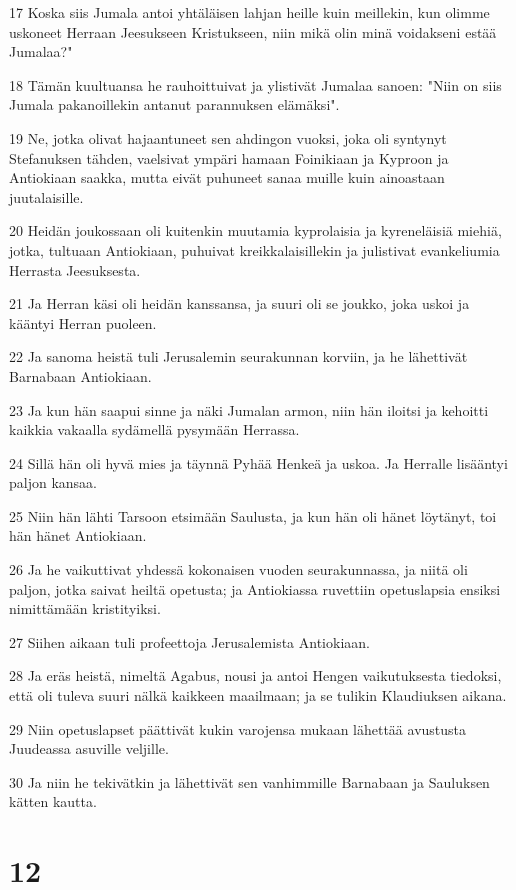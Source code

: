 \par 17 Koska siis Jumala antoi yhtäläisen lahjan heille kuin meillekin, kun olimme uskoneet Herraan Jeesukseen Kristukseen, niin mikä olin minä voidakseni estää Jumalaa?"
\par 18 Tämän kuultuansa he rauhoittuivat ja ylistivät Jumalaa sanoen: "Niin on siis Jumala pakanoillekin antanut parannuksen elämäksi".
\par 19 Ne, jotka olivat hajaantuneet sen ahdingon vuoksi, joka oli syntynyt Stefanuksen tähden, vaelsivat ympäri hamaan Foinikiaan ja Kyproon ja Antiokiaan saakka, mutta eivät puhuneet sanaa muille kuin ainoastaan juutalaisille.
\par 20 Heidän joukossaan oli kuitenkin muutamia kyprolaisia ja kyreneläisiä miehiä, jotka, tultuaan Antiokiaan, puhuivat kreikkalaisillekin ja julistivat evankeliumia Herrasta Jeesuksesta.
\par 21 Ja Herran käsi oli heidän kanssansa, ja suuri oli se joukko, joka uskoi ja kääntyi Herran puoleen.
\par 22 Ja sanoma heistä tuli Jerusalemin seurakunnan korviin, ja he lähettivät Barnabaan Antiokiaan.
\par 23 Ja kun hän saapui sinne ja näki Jumalan armon, niin hän iloitsi ja kehoitti kaikkia vakaalla sydämellä pysymään Herrassa.
\par 24 Sillä hän oli hyvä mies ja täynnä Pyhää Henkeä ja uskoa. Ja Herralle lisääntyi paljon kansaa.
\par 25 Niin hän lähti Tarsoon etsimään Saulusta, ja kun hän oli hänet löytänyt, toi hän hänet Antiokiaan.
\par 26 Ja he vaikuttivat yhdessä kokonaisen vuoden seurakunnassa, ja niitä oli paljon, jotka saivat heiltä opetusta; ja Antiokiassa ruvettiin opetuslapsia ensiksi nimittämään kristityiksi.
\par 27 Siihen aikaan tuli profeettoja Jerusalemista Antiokiaan.
\par 28 Ja eräs heistä, nimeltä Agabus, nousi ja antoi Hengen vaikutuksesta tiedoksi, että oli tuleva suuri nälkä kaikkeen maailmaan; ja se tulikin Klaudiuksen aikana.
\par 29 Niin opetuslapset päättivät kukin varojensa mukaan lähettää avustusta Juudeassa asuville veljille.
\par 30 Ja niin he tekivätkin ja lähettivät sen vanhimmille Barnabaan ja Sauluksen kätten kautta.

\chapter{12}


